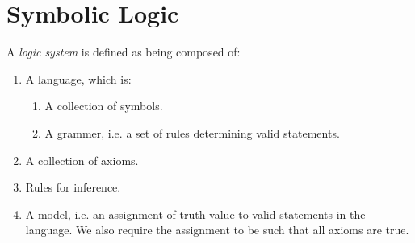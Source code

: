 \section{Symbolic Logic}
\begin{definition}\label{def:logic}
  A \textit{logic system} is defined as being composed of:
  \begin{enumerate}
    \item A language, which is:
      \begin{enumerate}
        \item A collection of symbols.
        \item A grammer, i.e. a set of rules determining valid statements.
      \end{enumerate}
    \item A collection of axioms.
    \item Rules for inference.
    \item A model, i.e. an assignment of truth value to valid statements in the language. We also require the assignment to be such that all axioms are true. 
  \end{enumerate}
\end{definition}
